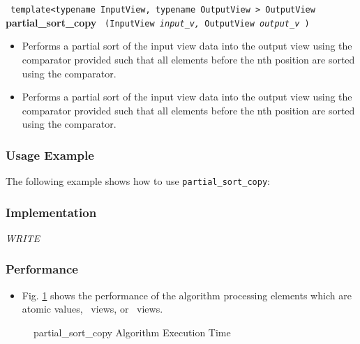 \noindent
\texttt{%
template<typename InputView, typename OutputView >
\newline
OutputView 
}
\newline
\textbf{partial\_sort\_copy}%
\texttt{%
(InputView 
\textit{input\_v,}%
OutputView 
\textit{output\_v}%
)
}

\begin{itemize}
\item
Performs a partial sort of the input view data into the output view using the comparator provided such that all elements before the nth position are sorted using the comparator. 
\item
Performs a partial sort of the input view data into the output view using the comparator provided such that all elements before the nth position are sorted using the comparator. 
\end{itemize}

\subsubsection{Usage Example} %

The following example shows how to use \texttt{partial\_sort\_copy}:

 
\subsubsection{Implementation} %

\textit{WRITE}

\subsubsection{Performance} %

\begin{itemize}
\item
Fig. \ref{fig:part-copy-alg-exec-exper}
shows the performance of the algorithm processing
elements which are atomic values, \stl\ views, or \stapl\ views.
\end{itemize}

\begin{figure}[p]
\caption{partial\_sort\_copy Algorithm Execution Time}
\label{fig:part-copy-alg-exec-exper}
\end{figure}

